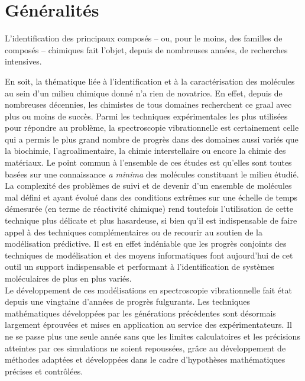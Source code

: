 \section{Généralités}

L'identification des principaux composés -- ou, pour le moins, des familles de composés -- chimiques fait l'objet, depuis de nombreuses années, de recherches intensives.

En soit, la thématique liée à l'identification et à la caractérisation des molécules au sein d'un milieu chimique donné n'a rien de novatrice. En effet, depuis de nombreuses décennies, les chimistes de tous domaines recherchent ce \og graal \fg{} avec plus ou moins de succès. Parmi les techniques expérimentales les plus utilisées pour répondre au problème, la spectroscopie vibrationnelle est certainement celle qui a permis le plus grand nombre de progrès dans des domaines aussi variés que la biochimie, l'agroalimentaire, la chimie interstellaire ou encore la chimie des matériaux. Le point commun à l'ensemble de ces études est qu'elles sont toutes basées sur une connaissance \textit{a minima} des molécules constituant le milieu étudié. La complexité des problèmes de suivi et de devenir d’un ensemble de molécules mal défini et ayant évolué dans des conditions extrêmes sur une échelle de temps démesurée (en terme de réactivité chimique) rend toutefois l'utilisation de cette technique plus délicate et plus hasardeuse, si bien qu'il est indispensable de faire appel à des techniques complémentaires ou de recourir au soutien de la modélisation prédictive. Il est en effet indéniable que les progrès conjoints des techniques de modélisation et des moyens informatiques font aujourd'hui de cet outil un support indispensable et performant à l'identification de systèmes moléculaires de plus en plus variés.\\

Le développement de ces modélisations en spectroscopie vibrationnelle fait état depuis une vingtaine d'années de progrès fulgurants. Les techniques mathématiques développées par les générations précédentes sont désormais largement éprouvées et mises en application au service des expérimentateurs.
Il ne se passe plus une seule année sans que les limites calculatoires et les précisions atteintes par ces simulations ne soient repoussées, grâce au développement de méthodes adaptées et développées dans le cadre d'hypothèses mathématiques précises et contrôlées. \\

